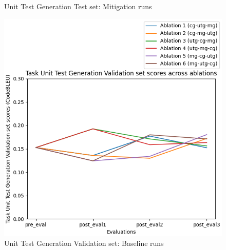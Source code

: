 \begin{figure}[H]
\begin{minipage}{0.45\textwidth}
        \captionsetup{width=1.1\textwidth}
        \caption{Unit Test Generation Test set: Mitigation runs}
        \label{UTGTestMitigation}
    \end{minipage}
\end{figure}

\begin{figure}[H]
    \centering
    \begin{minipage}{0.45\textwidth}
        \centering
        \includegraphics[width=1.1\textwidth]{Figures/results/code_baseline_graphs/task_eval/seed_averaged_task_utg_val_eval_baseline.png} %
        \captionsetup{width=1.1\textwidth}
        \caption{Unit Test Generation Validation set: Baseline runs}
        \label{UTGValBaseline}
    \end{minipage}\hfill
    \begin{minipage}{0.45\textwidth}
        \centering

\end{minipage}
\end{figure}
